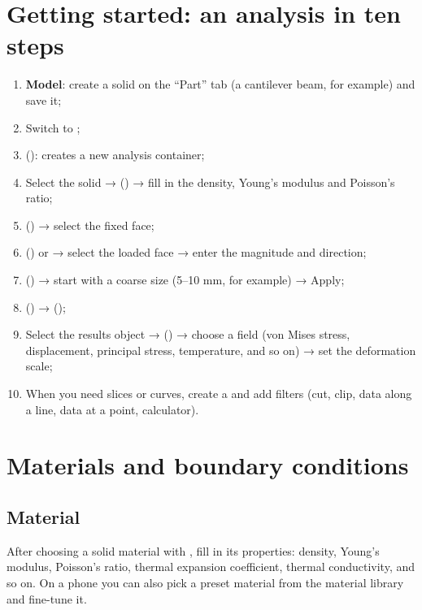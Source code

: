 \section{Getting started: an analysis in ten steps}

\begin{enumerate}
  \item \textbf{Model}: create a solid on the ``Part'' tab (a cantilever beam, for example) and save it;
  \item Switch to ;
  \item {} (): creates a new analysis container;
  \item Select the solid →  () → fill in the density, Young's modulus
        and Poisson's ratio;
  \item {} () → select the fixed face;
  \item {} () or  → select the loaded face → enter the
        magnitude and direction;
  \item {} () → start with a coarse size (5--10 mm, for
        example) → Apply;
  \item {} () →  ();
  \item Select the results object →  () → choose a field (von Mises
        stress, displacement, principal stress, temperature, and so on) → set the deformation scale;
  \item When you need slices or curves, create a  and add filters (cut, clip,
        data along a line, data at a point, calculator).
\end{enumerate}

\section{Materials and boundary conditions}

\subsection{Material}

After choosing a solid material with , fill in its properties: density, Young's modulus,
Poisson's ratio, thermal expansion coefficient, thermal conductivity, and so on. On a phone you can also
pick a preset material from the material library and fine-tune it.

